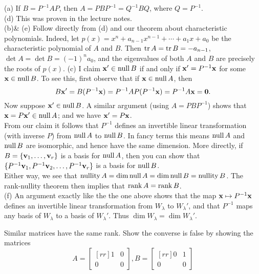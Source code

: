 \begin{solution}
\noindent
(a) If $B=P^{-1}AP$, then $A=PBP^{-1}=Q^{-1}BQ$, where $Q=P^{-1}$. 
\vspace{.1in}
\\
(d) This was proven in the lecture notes. 
\vspace{.1in}
\\
(b)\& (e) Follow directly from (d) and our theorem about characteristic polynomials. Indeed, let $p(x)=x^n+a_{n-1}x^{n-1}+\cdots +a_1x+a_0$ be the characteristic polynomial of $A$ and $B$. Then $\operatorname{tr} A=\operatorname{tr} B=-a_{n-1}$, $\det A=\det B=(-1)^na_0$, and the eigenvalues of both $A$ and $B$ are precisely the roots of $p(x)$. 
(c) I claim ${\mathbf x}'\in \operatorname{null} B$ if and only if ${\mathbf x}'=P^{-1}{\mathbf x}$ for some ${\mathbf x}\in \operatorname{null} B$. To see this, first observe that if ${\mathbf x}\in\operatorname{null} A$, then 
\[
B{\mathbf x}'=B(P^{-1}{\mathbf x})=P^{-1}AP(P^{-1}{\mathbf x})=P^{-1}A{\mathbf x}={\mathbf 0}.
\]
Now suppose ${\mathbf x}'\in \operatorname{null} B$. A similar argument (using $A=PBP^{-1}$) shows that ${\mathbf x}=P{\mathbf x}'\in \operatorname{null} A$; and we have ${\mathbf x}'=P{\mathbf x}$.
\vspace{.1in}
\\
From our claim it follows that $P^{-1}$ defines an invertible linear transformation (with inverse $P$) from $\operatorname{null} A$ to $\operatorname{null} B$. In fancy terms this means $\operatorname{null} A$ and $\operatorname{null} B$ are isomorphic, and hence have the same dimension. More directly, if $B=\{{\mathbf v}_1,\dots, {\mathbf v}_r\}$ is a basis for $\operatorname{null} A$, then you can show that $\{P^{-1}{\mathbf v}_1, P^{-1}{\mathbf v}_2, \dots , P^{-1}{\mathbf v}_r\}$ is a basis for $\operatorname{null} B$.  
\vspace{.1in}
\\
Either way, we see that $\operatorname{nullity} A=\dim \operatorname{null} A=\dim\operatorname{null} B=\operatorname{nullity} B$. The rank-nullity theorem then implies that $\operatorname{rank} A=\operatorname{rank} B$. 
\vspace{.1in}
\\
(f) An argument exactly like the the one above shows that the map ${\mathbf x}\mapsto P^{-1}{\mathbf x}$ defines an invertible linear transformation from $W_\lambda$ to $W_\lambda'$, and that $P^{-1}$ maps any basis of $W_{\lambda}$ to a basis of $W_{\lambda}'$. Thus $\dim W_{\lambda}=\dim W_{\lambda}'$. 
\end{solution}
\ii Similar matrices have the same rank. Show the converse is false by showing the matrices
$$
A =
\begin{bmatrix}[rr]
1&0\\
0&0
\end{bmatrix}
,
B =
\begin{bmatrix}[rr]
0&1\\
0&0
\end{bmatrix}
$$
